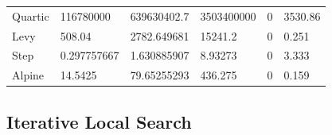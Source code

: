 \documentclass[12pt]{article}
\begin{document}
\begin{table}[h]
\begin{tabular}{llllll}
				Quartic                 & 116780000        & 639630402.7       & 3503400000     & 0               & 3530.86        \\
				Levy                    & 508.04           & 2782.649681       & 15241.2        & 0               & 0.251          \\
				Step                    & 0.297757667      & 1.630885907       & 8.93273        & 0               & 3.333          \\
				Alpine                  & 14.5425          & 79.65255293       & 436.275        & 0               & 0.159          \\
				\hline
			\end{tabular}
		\end{table}
	\newpage
		\subsection{Iterative Local Search}
\end{document}
